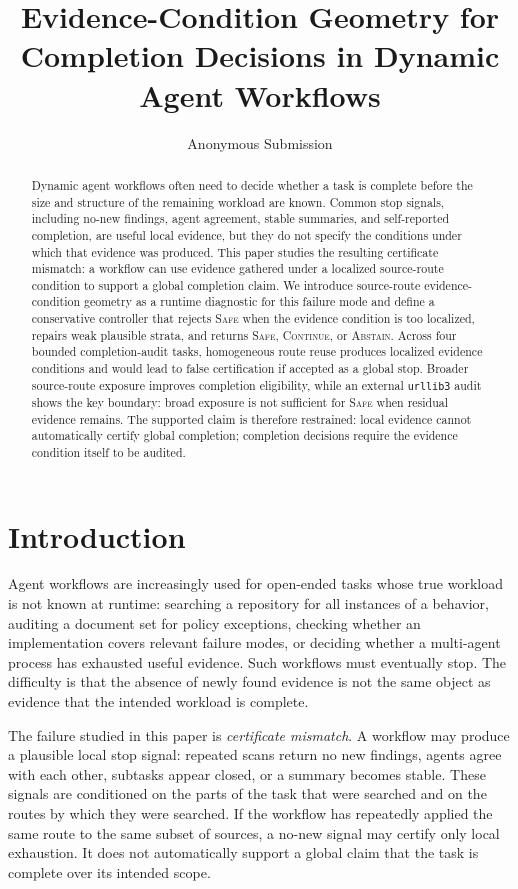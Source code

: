 \documentclass[letterpaper,10pt,twocolumn]{article}
\title{Evidence-Condition Geometry for Completion Decisions in Dynamic Agent Workflows}
\author{Anonymous Submission}
\date{}
\newcommand{\safe}{\textsc{Safe}}
\newcommand{\cont}{\textsc{Continue}}
\newcommand{\abstain}{\textsc{Abstain}}
\begin{document}
\maketitle

\begin{abstract}
Dynamic agent workflows often need to decide whether a task is complete before
the size and structure of the remaining workload are known. Common stop signals,
including no-new findings, agent agreement, stable summaries, and self-reported
completion, are useful local evidence, but they do not specify the conditions
under which that evidence was produced. This paper studies the resulting
certificate mismatch: a workflow can use evidence gathered under a localized
source-route condition to support a global completion claim. We introduce
source-route evidence-condition geometry as a runtime diagnostic for this
failure mode and define a conservative controller that rejects \safe{} when the
evidence condition is too localized, repairs weak plausible strata, and returns
\safe{}, \cont{}, or \abstain{}. Across four bounded completion-audit tasks,
homogeneous route reuse produces localized evidence conditions and would lead to
false certification if accepted as a global stop. Broader source-route exposure
improves completion eligibility, while an external \texttt{urllib3} audit shows
the key boundary: broad exposure is not sufficient for \safe{} when residual
evidence remains. The supported claim is therefore restrained: local evidence
cannot automatically certify global completion; completion decisions require the
evidence condition itself to be audited.
\end{abstract}

\section{Introduction}

Agent workflows are increasingly used for open-ended tasks whose true workload is
not known at runtime: searching a repository for all instances of a behavior,
auditing a document set for policy exceptions, checking whether an implementation
covers relevant failure modes, or deciding whether a multi-agent process has
exhausted useful evidence. Such workflows must eventually stop. The difficulty is
that the absence of newly found evidence is not the same object as evidence that
the intended workload is complete.

The failure studied in this paper is \emph{certificate mismatch}. A workflow may
produce a plausible local stop signal: repeated scans return no new findings,
agents agree with each other, subtasks appear closed, or a summary becomes
stable. These signals are conditioned on the parts of the task that were
searched and on the routes by which they were searched. If the workflow has
repeatedly applied the same route to the same subset of sources, a no-new signal
may certify only local exhaustion. It does not automatically support a global
claim that the task is complete over its intended scope.
\end{document}
